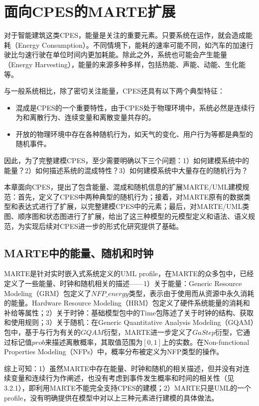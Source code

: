 \chapter{面向CPES的MARTE扩展}
\label{ch3}
	对于智能建筑这类CPES，能量是关注的重要元素。只要系统在运作，就会造成能耗（Energy Consumption）。不同情境下，能耗的速率可能不同，如汽车的加速行驶比匀速行驶在单位时间内更加耗能。除此之外，系统也可能会产生能量（Energy Harvesting），能量的来源多种多样，包括热能、声能、动能、生化能\citep{DBLP:conf/iimss/SaidaKBA16}等。
	
	与一般系统相比，除了密切关注能量，CPES还具有以下两个典型特征：
	\begin{itemize}
	\item 混成是CPES的一个重要特性，由于CPES处于物理环境中，系统必然是连续行为和离散行为、连续变量和离散变量共存的。
	\item 开放的物理环境中存在各种随机行为，如天气的变化、用户行为等都是典型的随机事件。
	\end{itemize}

	因此，为了完整建模CPES，至少需要明确以下三个问题：1）如何建模系统中的能量？2）如何描述系统的混成特性？3）如何建模系统中大量存在的随机行为？	
	
	本章面向CPES，提出了包含能量、混成和随机信息的扩展MARTE/UML建模规范：首先，定义了CPES中两种典型的随机行为；接着，对MARTE原有的数据类型和表达式进行了扩展，以完整建模CPES中的元素；最后，对MARTE/UML类图、顺序图和状态图进行了扩展，给出了这三种模型的元模型定义和语法、语义规范，为实现后续对CPES进一步的形式化研究提供了基础。
	
\section{MARTE中的能量、随机和时钟}
	MARTE是针对实时嵌入式系统定义的UML profile，在MARTE的众多包中，已经定义了一些能量、时钟和随机相关的描述——1）关于能量：Generic Resource Modeling（GRM）包定义了$NFP\_energy$类型，表示由于使用而从资源中永久消耗的能量。Hardware Resource Modeling（HRM）包定义了硬件系统能量的消耗和补给等属性；2）关于时钟：基础模型包中的Time包陈述了关于时钟的结构、获取和使用规则；3）关于随机：在Generic Quantitative Analysis Modeling（GQAM）包中，基于与行为有关的$GQAM$衍型，MARTE进一步定义了$GaStep$衍型，它通过标记值$prob$来描述离散概率，其取值范围为$[0,1]$上的实数。在Non-functional Properties Modeling（NFPs）中，概率分布被定义为NFP类型的操作。

	综上可知：1）虽然MARTE中存在能量、时钟和随机的相关描述，但并没有对连续变量和连续行为作阐述，也没有考虑到事件发生概率和时间的相关性（见3.2.1），即利用MARTE不能完全支持CPES的建模；2）MARTE只是UML的一个profile，没有明确提供在模型中对以上三种元素进行建模的具体做法。


